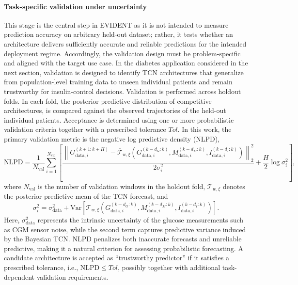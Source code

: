 \documentclass[preprint,12pt]{elsarticle}
\begin{document}
\paragraph{Task-specific validation under uncertainty}
This stage is the central step in EVIDENT as it is not intended to measure prediction accuracy on arbitrary held-out dataset; rather, it tests whether an architecture delivers sufficiently accurate and reliable predictions for the intended deployment regime. Accordingly, the validation design must be problem-specific and aligned with the target use case. In the diabetes application considered in the next section, validation is designed to identify TCN architectures that generalize from population-level training data to unseen individual patients and remain trustworthy for insulin-control decisions. Validation is performed across holdout folds. In each fold, the posterior predictive distribution of competitive architectures, is compared against the observed trajectories of the held-out individual patients.
%
Acceptance is determined using one or more probabilistic validation criteria together with a prescribed tolerance $Tol$.
In this work, the primary validation metric is the negative log predictive density (NLPD),
%
\begin{equation} 
\mathrm{NLPD} = \frac{1}{N_{\mathrm{val}}} \sum_{i=1}^{N_{\mathrm{val}}} \left[ \frac{ \left\| G_{\mathrm{data},i}^{(k+1:k+H)} - \overline{\mathcal{T}}_{w,\xi}\!\left( G_{\mathrm{data},i}^{(k-d_G:k)}, M_{\mathrm{data},i}^{(k-d_M:k)}, I_{\mathrm{data},i}^{(k-d_I:k)} \right) \right\|_2^2 }{2\sigma_i^2} + \frac{H}{2}\log \sigma_i^2 \right], 
\label{eq:nlpd} 
\end{equation} 
%
where \(N_{\mathrm{val}}\) is the number of validation windows in the holdout fold, \(\overline{\mathcal{T}}_{w,\xi}\) denotes the posterior predictive mean of the TCN forecast, and 
%
\begin{equation} 
\sigma_i^2 = \sigma_{\mathrm{data}}^2 + \mathrm{Var}\!\left[ \mathcal{T}_{w,\xi}\!\left( G_{\mathrm{data},i}^{(k-d_G:k)}, M_{\mathrm{data},i}^{(k-d_M:k)}, I_{\mathrm{data},i}^{(k-d_I:k)} \right) \right]. 
\label{eq:sigma_nlpd} 
\end{equation} 
%
Here, \(\sigma_{\mathrm{data}}^2\) represents the intrinsic uncertainty of the glucose measurements such as CGM sensor noise, while the second term captures predictive variance induced by the Bayesian TCN.
NLPD penalizes both inaccurate forecasts and unreliable predictive, making it a natural criterion for assessing probabilistic forecasting. A candidate architecture is accepted as ``trustworthy predictor'' if it satisfies a prescribed tolerance, i.e., \(\mathrm{NLPD} \leq Tol\), possibly together with additional task-dependent validation requirements.
\end{document}
